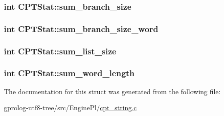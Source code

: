 \subsubsection[{\texorpdfstring{sum\+\_\+branch\+\_\+size}{sum_branch_size}}]{\setlength{\rightskip}{0pt plus 5cm}int C\+P\+T\+Stat\+::sum\+\_\+branch\+\_\+size}\hypertarget{structCPTStat_a3b3e8fa6689f9725a871430adddf0f30}{}\label{structCPTStat_a3b3e8fa6689f9725a871430adddf0f30}
\subsubsection[{\texorpdfstring{sum\+\_\+branch\+\_\+size\+\_\+word}{sum_branch_size_word}}]{\setlength{\rightskip}{0pt plus 5cm}int C\+P\+T\+Stat\+::sum\+\_\+branch\+\_\+size\+\_\+word}\hypertarget{structCPTStat_adaea66ddd9de22bf900d0eeeb5486eac}{}\label{structCPTStat_adaea66ddd9de22bf900d0eeeb5486eac}
\subsubsection[{\texorpdfstring{sum\+\_\+list\+\_\+size}{sum_list_size}}]{\setlength{\rightskip}{0pt plus 5cm}int C\+P\+T\+Stat\+::sum\+\_\+list\+\_\+size}\hypertarget{structCPTStat_ad99f1b443d4a863deb09e79760adf33f}{}\label{structCPTStat_ad99f1b443d4a863deb09e79760adf33f}
\subsubsection[{\texorpdfstring{sum\+\_\+word\+\_\+length}{sum_word_length}}]{\setlength{\rightskip}{0pt plus 5cm}int C\+P\+T\+Stat\+::sum\+\_\+word\+\_\+length}\hypertarget{structCPTStat_a8db546c8f4954a69815d75a4ab62a884}{}\label{structCPTStat_a8db546c8f4954a69815d75a4ab62a884}


The documentation for this struct was generated from the following file\+:\begin{DoxyCompactItemize}
\item 
gprolog-\/utf8-\/tree/src/\+Engine\+Pl/\hyperlink{cpt__string_8c}{cpt\+\_\+string.\+c}\end{DoxyCompactItemize}

